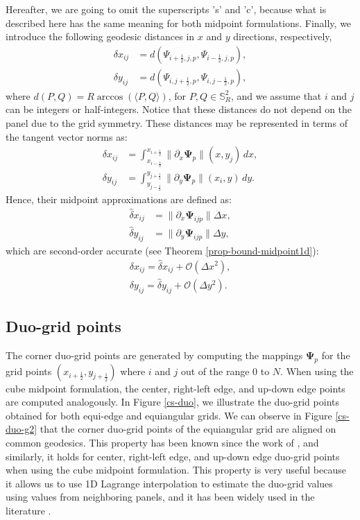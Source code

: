 Hereafter, we are going to omit the superscripts 's' and 'c', because what is described here has the same meaning for both midpoint formulations.
Finally, we introduce the following geodesic distances in $x$ and $y$ directions, respectively,
\begin{align}
	\label{distcube}
	{\delta} x_{ij} &= d(\Psi_{i+\frac{1}{2},j,p},\Psi_{i-\frac{1}{2},j,p}) ,\\
	{\delta} y_{ij} &= d(\Psi_{i,j+\frac{1}{2},p},\Psi_{i,j-\frac{1}{2},p}),
\end{align}
where $d(P,Q) = R\arccos{(\langle P, Q \rangle)}$, for $P,Q \in \mathbb{S}^2_R$, and we assume that $i$ and $j$ can be integers or half-integers.
Notice that these distances do not depend on the panel due to the grid symmetry.
These distances may be represented in terms of the tangent vector norms as:
\begin{align}
	{\delta} x_{ij} &= 
	\int_{x_{i-\frac{1}{2}}}^{x_{i+\frac{1}{2}}}
	\|\partial_x  \mathbf{\Psi}_{p}\|(x,y_j) \,dx ,\\
	{\delta} y_{ij} &=
	\int_{y_{j-\frac{1}{2}}}^{y_{j+\frac{1}{2}}}
	\|\partial_y \mathbf{\Psi}_{p}\|(x_i,y) \,dy.
\end{align}
Hence, their midpoint approximations are defined as:
\begin{align}
	\label{distcube2}
	\hat{\delta} x_{ij} &= \|\partial_x \mathbf{\Psi}_{ijp} \|\Delta x,\\
	\hat{\delta} y_{ij} &= \|\partial_y \mathbf{\Psi}_{ijp} \|\Delta y,
\end{align}
which are second-order accurate (see Theorem \ref{prop-bound-midpoint1d}):
\begin{align}
\delta x_{ij} = \hat{\delta} x_{ij} + \mathcal{O}(\Delta x^2),\\
\delta y_{ij} = \hat{\delta} y_{ij} + \mathcal{O}(\Delta y^2).
\end{align}
\subsection{Duo-grid points}
\label{duogrid-points}
The corner duo-grid points are generated by computing the mappings $\boldsymbol{\Psi}_p$ for the grid points 
$(x_{i+\frac{1}{2}}, y_{j+\frac{1}{2}})$ where $i$ and $j$ out of the range $0$ to $N$. 
When using the cube midpoint formulation, the center, right-left edge, and up-down edge points are computed analogously.
In Figure \ref{cs-duo}, we illustrate the duo-grid points obtained for both equi-edge and equiangular grids.
We can observe in Figure \ref{cs-duo-g2} that the corner duo-grid points of the equiangular grid are aligned on common geodesics.
This property has been known since the work of \citet{ronchi:1996}, and similarly, it holds for center, right-left edge, and up-down edge duo-grid points when using the cube midpoint formulation.
This property is very useful because it allows us to use 1D Lagrange interpolation to estimate the duo-grid values using values 
from neighboring panels, and it has been widely used in the literature \citep{ross:2006, croisille:2013,katta:2015,katta:2015b, chen:2021}.

